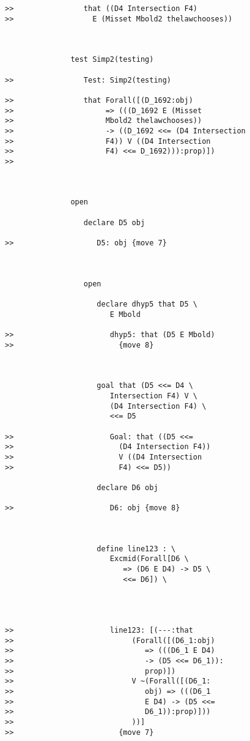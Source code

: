 \documentclass[12pt]{article}
\begin{document}
\begin{verbatim}
>>                that ((D4 Intersection F4)
>>                  E (Misset Mbold2 thelawchooses))



               test Simp2(testing)

>>                Test: Simp2(testing)

>>                that Forall([(D_1692:obj)
>>                     => (((D_1692 E (Misset
>>                     Mbold2 thelawchooses))
>>                     -> ((D_1692 <<= (D4 Intersection
>>                     F4)) V ((D4 Intersection
>>                     F4) <<= D_1692))):prop)])
>>                  



               open

                  declare D5 obj

>>                   D5: obj {move 7}



                  open

                     declare dhyp5 that D5 \
                        E Mbold

>>                      dhyp5: that (D5 E Mbold)
>>                        {move 8}



                     goal that (D5 <<= D4 \
                        Intersection F4) V \
                        (D4 Intersection F4) \
                        <<= D5

>>                      Goal: that ((D5 <<=
>>                        (D4 Intersection F4))
>>                        V ((D4 Intersection
>>                        F4) <<= D5))

                     declare D6 obj

>>                      D6: obj {move 8}



                     define line123 : \
                        Excmid(Forall[D6 \
                           => (D6 E D4) -> D5 \
                           <<= D6]) \
                        



>>                      line123: [(---:that
>>                           (Forall([(D6_1:obj)
>>                              => (((D6_1 E D4)
>>                              -> (D5 <<= D6_1)):
>>                              prop)])
>>                           V ~(Forall([(D6_1:
>>                              obj) => (((D6_1
>>                              E D4) -> (D5 <<=
>>                              D6_1)):prop)]))
>>                           ))]
>>                        {move 7}




\end{verbatim}
\end{document}
